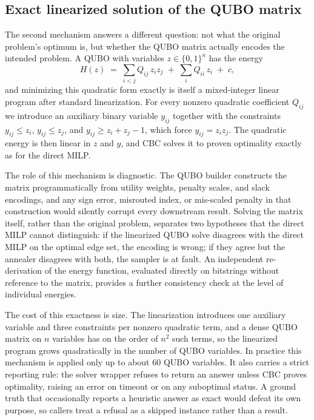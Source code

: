 \subsection{Exact linearized solution of the QUBO matrix}

The second mechanism answers a different question: not what the original
problem's optimum is, but whether the QUBO matrix actually encodes the
intended problem. A QUBO with variables $z \in \{0,1\}^n$ has the energy
\begin{equation}
  H(z) \;=\; \sum_{i < j} Q_{ij}\, z_i z_j \;+\; \sum_i Q_{ii}\, z_i
  \;+\; c,
\end{equation}
and minimizing this quadratic form exactly is itself a mixed-integer
linear program after standard linearization. For every nonzero quadratic
coefficient $Q_{ij}$ we introduce an auxiliary binary variable
$y_{ij}$ together with the constraints $y_{ij} \le z_i$, $y_{ij} \le z_j$,
and $y_{ij} \ge z_i + z_j - 1$, which force $y_{ij} = z_i z_j$. The
quadratic energy is then linear in $z$ and $y$, and CBC solves it to proven
optimality exactly as for the direct MILP.

The role of this mechanism is diagnostic. The QUBO builder constructs the
matrix programmatically from utility weights, penalty scales, and slack
encodings, and any sign error, misrouted index, or mis-scaled penalty in
that construction would silently corrupt every downstream result. Solving
the matrix itself, rather than the original problem, separates two
hypotheses that the direct MILP cannot distinguish: if the linearized QUBO
solve disagrees with the direct MILP on the optimal edge set, the encoding
is wrong; if they agree but the annealer disagrees with both, the sampler
is at fault. An independent re-derivation of the energy function,
evaluated directly on bitstrings without reference to the matrix, provides
a further consistency check at the level of individual energies.

The cost of this exactness is size. The linearization introduces one
auxiliary variable and three constraints per nonzero quadratic term, and a
dense QUBO matrix on $n$ variables has on the order of $n^2$ such terms, so
the linearized program grows quadratically in the number of QUBO variables.
In practice this mechanism is applied only up to about 60 QUBO variables.
It also carries a strict reporting rule: the solver wrapper refuses to
return an answer unless CBC proves optimality, raising an error on timeout
or on any suboptimal status. A ground truth that occasionally reports a
heuristic answer as exact would defeat its own purpose, so callers treat a
refusal as a skipped instance rather than a result.


